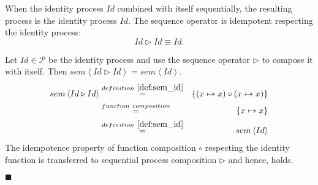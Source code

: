 \begin{theorem}
\label{thm:idempotence_identity}
When the identity process $Id$ combined with itself sequentially, the resulting process is the identity process $Id$. The sequence operator is idempotent respecting the identity process:
\begin{equation*}
  Id \triangleright Id \equiv Id.
\end{equation*}
\end{theorem}

\begin{myproof}
Let $Id \in \mathcal{P}$ be the identity process and use the sequence operator $\triangleright$ to compose it with itself. Then $sem \left\langle Id \triangleright Id \right\rangle = sem \left\langle Id \right\rangle$.
\begin{eqnarray*}
  sem \left\langle Id \triangleright Id \right\rangle & \overset{\defref{def:sem_id}}{=} & \left\{ \left( x \mapsto x \right) \circ \left( x \mapsto x \right) \right\} \\
  & \overset{function \ composition}{=} & \left\{ x \mapsto x \right\} \\
  & \overset{\defref{def:sem_id}}{=} & sem \left\langle Id \right\rangle
\end{eqnarray*}
The idempotence property of function composition $\circ$ respecting the identity function is transferred to sequential process composition $\triangleright$ and hence,  holds.

\hfill$\blacksquare$
\end{myproof}

\begin{myproof}
\end{myproof}

\begin{myproof}
\end{myproof}

